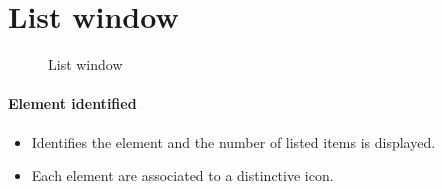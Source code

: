 \documentclass[letterpaper,10pt,english]{sphinxmanual}
\begin{document}
\section{List window}
\label{Gui:gui-list-window-label}\label{Gui:list-window}\begin{figure}[htbp]
\centering
\capstart

\caption{List window}\end{figure}
\begin{figure}[htbp]
\centering

\end{figure}
\paragraph{Element identified}
\begin{itemize}
\item {} 
Identifies the element and the number of listed items is displayed.

\item {} 
Each element are associated to a distinctive icon.

\end{itemize}
\end{document}
